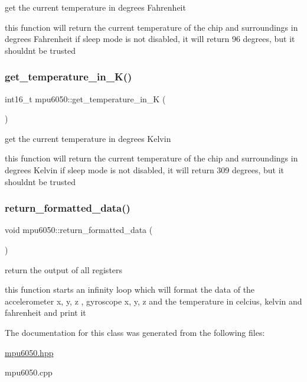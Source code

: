 get the current temperature in degrees Fahrenheit 

this function will return the current temperature of the chip and surroundings in degrees Fahrenheit if sleep mode is not disabled, it will return 96 degrees, but it shouldn\textquotesingle{}t be trusted \mbox{\label{classmpu6050_a8cce3546551572c7518962c193183a17}} 
\subsubsection{\texorpdfstring{get\+\_\+temperature\+\_\+in\+\_\+\+K()}{get\_temperature\_in\_K()}}
{\footnotesize\ttfamily int16\+\_\+t mpu6050\+::get\+\_\+temperature\+\_\+in\+\_\+K (\begin{DoxyParamCaption}{ }\end{DoxyParamCaption})}



get the current temperature in degrees Kelvin 

this function will return the current temperature of the chip and surroundings in degrees Kelvin if sleep mode is not disabled, it will return 309 degrees, but it shouldn\textquotesingle{}t be trusted \mbox{\label{classmpu6050_aef4c4ff834f62b2a57342fa6c761f701}} 
\subsubsection{\texorpdfstring{return\+\_\+formatted\+\_\+data()}{return\_formatted\_data()}}
{\footnotesize\ttfamily void mpu6050\+::return\+\_\+formatted\+\_\+data (\begin{DoxyParamCaption}{ }\end{DoxyParamCaption})}



return the output of all registers 

this function starts an infinity loop which will format the data of the accelerometer x, y, z , gyroscope x, y, z and the temperature in celcius, kelvin and fahrenheit and print it 

The documentation for this class was generated from the following files\+:\begin{DoxyCompactItemize}
\item 
\hyperlink{mpu6050_8hpp}{mpu6050.\+hpp}\item 
mpu6050.\+cpp\end{DoxyCompactItemize}
